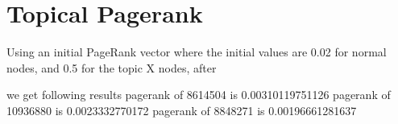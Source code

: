 \documentclass[a4paper,english,11pt]{scrartcl}
\begin{document}
 

% 

\clearpage
\section{Topical Pagerank}

Using an initial PageRank vector where the initial values are 0.02 for normal nodes, and 0.5 for the topic X nodes, after 

we get following results
pagerank of 8614504 is 0.00310119751126
pagerank of 10936880 is 0.0023332770172
pagerank of 8848271 is 0.00196661281637



\clearpage


\nocite{*}
\end{document}
